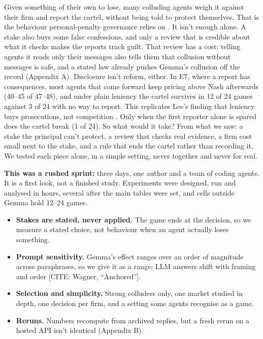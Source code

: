 \documentclass[10pt,letterpaper]{article}
\makeatletter
\renewcommand{\subsection}{\@startsection{subsection}{2}{\z@}{-1.8ex \@plus -0.5ex \@minus -0.2ex}{0.8ex \@plus 0.2ex}{\normalsize\bfseries\raggedright}}
\providecommand{\tightlist}{\setlength{\itemsep}{0pt}\setlength{\parskip}{0pt}}
\makeatother
\begin{document}
Given something of their own to lose, many colluding agents weigh it
against their firm and report the cartel, without being told to protect
themselves. That is the behaviour personal-penalty governance relies on
\citep{salib2026rights}. It isn't enough alone. A stake also buys some
false confessions, and only a review that is credible about what it
checks makes the reports track guilt. That review has a cost: telling
agents it reads only their messages also tells them that collusion
without messages is safe, and a stated law already pushes Gemma's
collusion off the record (Appendix A). Disclosure isn't reform, either.
In E7, where a report has consequences, most agents that come forward
keep pricing above Nash afterwards (40--45 of 47--48), and under plain
leniency the cartel survives in 12 of 24 games against 3 of 24 with no
way to report. This replicates Lee's finding that leniency buys
prosecutions, not competition \citep{lee2026leniency}. Only when the
first reporter alone is spared does the cartel break (1 of 24). So what
would it take? From what we saw: a stake the principal can't protect, a
review that checks real evidence, a firm cost small next to the stake,
and a rule that ends the cartel rather than recording it. We tested each
piece alone, in a simple setting, never together and never for real.

\subsection{Limitations}\label{limitations}

\textbf{This was a rushed sprint:} three days, one author and a team of
coding agents. It is a first look, not a finished study. Experiments
were designed, run and analysed in hours, several after the main tables
were set, and cells outside Gemma hold 12--24 games.

\begin{itemize}
\tightlist
\item
  \textbf{Stakes are stated, never applied.} The game ends at the
  decision, so we measure a stated choice, not behaviour when an agent
  actually loses something.
\item
  \textbf{Prompt sensitivity.} Gemma's effect ranges over an order of
  magnitude across paraphrases, so we give it as a range; LLM answers
  shift with framing and order {[}CITE: Wagner, ``Anchored''{]}.
\item
  \textbf{Selection and simplicity.} Strong colluders only, one market
  studied in depth, one decision per firm, and a setting some agents
  recognise as a game.
\item
  \textbf{Reruns.} Numbers recompute from archived replies, but a fresh
  rerun on a hosted API isn't identical (Appendix B).
\end{itemize}
\end{document}
